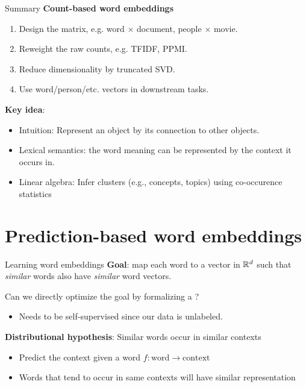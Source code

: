 \documentclass[usenames,dvipsnames,notes,11pt,aspectratio=169]{beamer}
\newcommand{\pdfnote}[1]{}
\begin{document}
\begin{frame}
    {Summary}
    \textbf{Count-based word embeddings}\\
    \begin{enumerate}
        \item Design the matrix, e.g. word $\times$ document, people $\times$ movie.
        \item Reweight the raw counts, e.g. TFIDF, PPMI.
        \item Reduce dimensionality by truncated SVD.
        \item Use word/person/etc. vectors in downstream tasks.
    \end{enumerate}
    
    \textbf{Key idea}:\\
    \begin{itemize}
        \item Intuition: Represent an object by its connection to other objects.
        \item Lexical semantics: the word meaning can be represented by the context it occurs in.
        \item Linear algebra: Infer clusters (e.g., concepts, topics) using co-occurence statistics
    \end{itemize}
\end{frame}

\section{Prediction-based word embeddings}

\begin{frame}
    {Learning word embeddings}
    \textbf{Goal}: map each word to a vector in $\mathbb{R}^d$ such that \textit{similar} words also have \textit{similar} word vectors.
    \pdfnote{The two "similar" have different meanings!}
    \vspace{1em}
    \pause

    Can we directly optimize the goal by formalizing a ?\\
    \begin{itemize}
        \item Needs to be self-supervised since our data is unlabeled.
    \end{itemize}
    \pause

    \textbf{Distributional hypothesis}: Similar words occur in similar contexts\\
    \begin{itemize}
        \item Predict the context given a word $f\colon \text{word} \rightarrow \text{context}$
        \item Words that tend to occur in same contexts will have similar representation
    \end{itemize}
    \pdfnote{
        If we can successfully predict the context given a word, that means that words that occur in similar contexts have similar representations.
    }
\end{frame}
\end{document}
